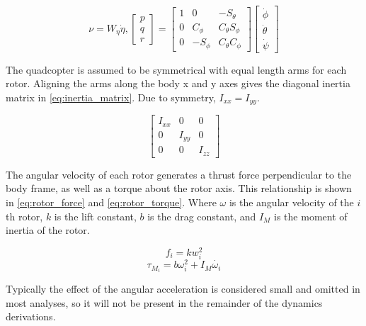 \documentclass[letterpaper,12pt,titlepage,oneside,final]{book}
\begin{document}
\begin{equation} \label{eq:local_angular_velocity}
\nu = W_{\eta}\dot{\eta},
\begin{bmatrix}
p \\
q \\
r
\end{bmatrix}
=
\begin{bmatrix}
1 & 0 & -S_{\theta} \\
0 & C_{\phi} & C_{\theta}S_{\phi} \\
0 & -S_{\phi} & C_{\theta}C_{\phi}
\end{bmatrix}
\begin{bmatrix}
\dot{\phi} \\
\dot{\theta} \\
\dot{\psi}
\end{bmatrix}
\end{equation}

The quadcopter is assumed to be symmetrical with equal length arms for each rotor. 
Aligning the arms along the body x and y axes gives the diagonal inertia matrix in \eqref{eq:inertia_matrix}. 
Due to symmetry, $I_{xx} = I_{yy}$.

\begin{equation} \label{eq:inertia_matrix}
\begin{bmatrix}
I_{xx} & 0 & 0 \\
0 & I_{yy} & 0 \\
0 & 0 & I_{zz}
\end{bmatrix}
\end{equation}

The angular velocity of each rotor generates a thrust force perpendicular to the body frame, as well as a torque about the rotor axis. 
This relationship is shown in \eqref{eq:rotor_force} and \eqref{eq:rotor_torque}. 
Where $\omega$ is the angular velocity of the $i$th rotor, $k$ is the lift constant, $b$ is the drag constant, and $I_{M}$ is the moment of inertia of the rotor.

\begin{equation} \label{eq:rotor_force}
f_{i} = kw_{i}^{2}
\end{equation}
\begin{equation} \label{eq:rotor_torque}
\tau_{M_{i}} = b\omega_{i}^{2} + I_{M}\dot{\omega_{i}}
\end{equation}

Typically the effect of the angular acceleration is considered small and omitted in most analyses, so it will not be present in the remainder of the dynamics derivations.
\end{document}
